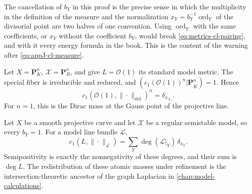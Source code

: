 The cancellation of $b_Y$ in this proof is the precise sense in which the
multiplicity in the definition of the measure and the normalization
$x_Y=b_Y^{-1}\operatorname{ord}_Y$ of the divisorial point are two halves
of one convention. Using $\operatorname{ord}_Y$ with the same coefficients,
or $x_Y$ without the coefficient $b_Y$, would break
\eqref{eq:metrics-cl-pairing}, and with it every energy formula in the book.
This is the content of the warning after \eqref{eq:appJ-cl-measure}.

\begin{example}
\label{ex:metrics-cl-good-reduction}
Let $X=\mathbf P^n_K$,
$\mathcal X=\mathbf P^n_R$, and give $L=\mathcal O(1)$ its standard
model metric. The special fiber is irreducible and reduced, and
$(c_1(\mathcal O(1))^n|\mathbf P^n_{\widetilde K})=1$. Hence
\[
                   c_1(\mathcal O(1),\|\cdot\|_{\mathrm{std}})^n
                   =\delta_{x_{\mathcal X_s}}.
\]
For $n=1$, this is the Dirac mass at the Gauss point of the projective
line.
\end{example}

\begin{example}
\label{ex:metrics-cl-semistable-curve}
Let $X$ be a smooth projective curve and let $\mathcal X$ be a regular
semistable model, so every $b_Y=1$. For a model line bundle
$\mathcal L$,
\[
                 c_1(L,\|\cdot\|_{\mathcal L})
                    =\sum_Y\deg(\mathcal L|_Y)\,\delta_{x_Y}.
\]
Semipositivity is exactly the nonnegativity of these degrees, and their sum
is $\deg L$. The redistribution of these atomic masses under refinement
is the intersection-theoretic ancestor of the graph Laplacian in
\cref{chap:model-calculations}.
\end{example}

